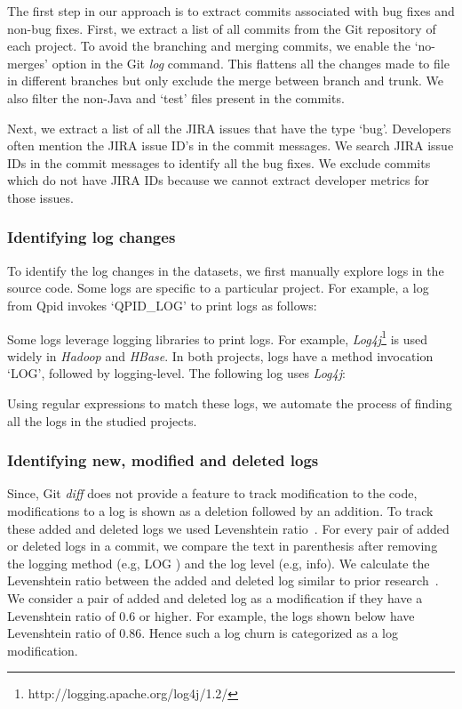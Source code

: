 The first step in our approach is to extract commits associated with bug fixes and non-bug fixes. First, we extract a list of all commits from the Git repository of each project. To avoid the branching and merging commits, we enable the `no-merges' option in the Git \textsl{log} command. This flattens all the changes made to file in different branches but only exclude the merge between branch and trunk. We also filter the non-Java and `test' files present in the commits. 

Next, we extract a list of all the JIRA issues that have the type `bug'. Developers often mention the JIRA issue ID's in the commit messages. We search JIRA issue IDs in the commit messages to identify all the bug fixes. We exclude commits which do not have JIRA IDs because we cannot extract developer metrics for those issues. 

\subsubsection{Identifying log changes}


To identify the log changes in the datasets, we first manually explore logs in the source code. Some logs are specific to a particular project. For example, a log from Qpid invokes `QPID\_LOG' to print logs as follows: 

Some logs leverage logging libraries to print logs. For example, \textsl{Log4j}\footnote{http://logging.apache.org/log4j/1.2/} is used widely in \emph{Hadoop} and \emph{HBase}. In both projects, logs have a method invocation `LOG', followed by logging-level. The following log uses \textsl{Log4j}:

Using regular expressions to match these logs, we automate the process of finding all the logs in the studied projects.


\subsubsection{Identifying new, modified and deleted logs}

Since, Git \textsl{diff} does not provide a feature to track modification to the code, modifications to a log is shown as a deletion followed by an addition. To track these added and deleted logs we used Levenshtein ratio~\cite{Levenshtein2}. For every pair of added or deleted logs in a commit, we compare the text in parenthesis after removing the logging method (e.g, LOG ) and the log level (e.g, info). We calculate the Levenshtein ratio between the added and deleted log similar to prior research~\cite{levenshteinratio}. We consider a pair of added and deleted log as a modification if they have a Levenshtein ratio of 0.6 or higher. For example, the logs shown below have Levenshtein ratio of 0.86. Hence such a log churn is categorized as a log modification.  

